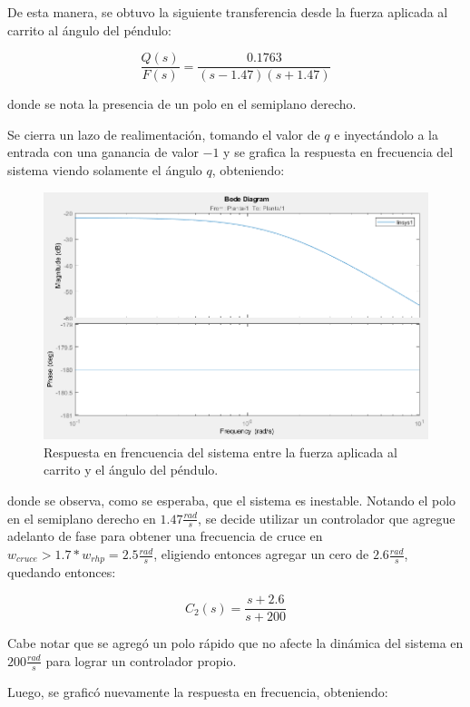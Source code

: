De esta manera, se obtuvo la siguiente transferencia desde la fuerza aplicada al carrito al ángulo del péndulo:

\begin{equation}
\frac{Q(s)}{F(s)} = \frac{0.1763}{(s-1.47)(s+1.47)}
\end{equation}

donde se nota la presencia de un polo en el semiplano derecho.

Se cierra un lazo de realimentación, tomando el valor de $q$ e inyectándolo a la entrada con una ganancia de valor $-1$ y se grafica la respuesta en frecuencia del sistema viendo solamente el ángulo $q$, obteniendo:

\begin{figure}[H]
	\centering
	\includegraphics[width=0.8\linewidth]{Imagenes/loopshaping/bode_cerrando_q}
	\caption{Respuesta en frencuencia del sistema entre la fuerza aplicada al carrito y el ángulo del péndulo.}
	\label{bode_cerrando_q}
\end{figure}

donde se observa, como se esperaba, que el sistema es inestable. Notando el polo en el semiplano derecho en $1.47 \frac{rad}{s}$, se decide utilizar un controlador que agregue adelanto de fase para obtener una frecuencia de cruce en $w_{cruce} > 1.7 * w_{rhp} = 2.5 \frac{rad}{s}$, eligiendo entonces agregar un cero de $2.6 \frac{rad}{s}$, quedando entonces:

\begin{equation}
C_2(s) = \frac{s+2.6}{s+200}
\end{equation} 

Cabe notar que se agregó un polo rápido que no afecte la dinámica del sistema en $200 \frac{rad}{s}$ para lograr un controlador propio.

Luego, se graficó nuevamente la respuesta en frecuencia, obteniendo:

